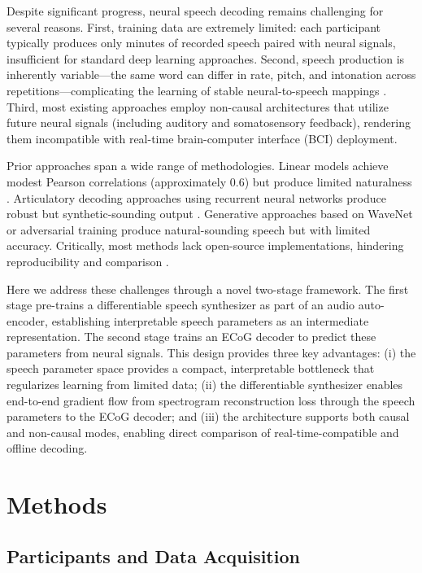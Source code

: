 \documentclass[11pt]{article}
\begin{document}
Despite significant progress, neural speech decoding remains challenging for several reasons. First, training data are extremely limited: each participant typically produces only minutes of recorded speech paired with neural signals, insufficient for standard deep learning approaches. Second, speech production is inherently variable---the same word can differ in rate, pitch, and intonation across repetitions---complicating the learning of stable neural-to-speech mappings \citep{chartier2018}. Third, most existing approaches employ non-causal architectures that utilize future neural signals (including auditory and somatosensory feedback), rendering them incompatible with real-time brain-computer interface (BCI) deployment.

Prior approaches span a wide range of methodologies. Linear models achieve modest Pearson correlations (approximately 0.6) but produce limited naturalness \citep{herff2015}. Articulatory decoding approaches using recurrent neural networks produce robust but synthetic-sounding output \citep{anumanchipalli2019}. Generative approaches based on WaveNet \citep{oord2016} or adversarial training produce natural-sounding speech but with limited accuracy. Critically, most methods lack open-source implementations, hindering reproducibility and comparison \citep{makin2020}.

Here we address these challenges through a novel two-stage framework. The first stage pre-trains a differentiable speech synthesizer as part of an audio auto-encoder, establishing interpretable speech parameters as an intermediate representation. The second stage trains an ECoG decoder to predict these parameters from neural signals. This design provides three key advantages: (i) the speech parameter space provides a compact, interpretable bottleneck that regularizes learning from limited data; (ii) the differentiable synthesizer enables end-to-end gradient flow from spectrogram reconstruction loss through the speech parameters to the ECoG decoder; and (iii) the architecture supports both causal and non-causal modes, enabling direct comparison of real-time-compatible and offline decoding.

\section{Methods}

\subsection{Participants and Data Acquisition}
\end{document}
